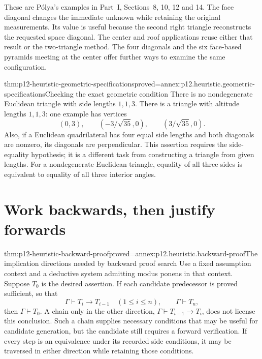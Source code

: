 These are P\'olya's examples in Part~I, Sections~8, 10, 12 and 14.
The face diagonal changes the immediate unknown while retaining the
original measurements. Its value is useful because the second
right triangle reconstructs the requested space diagonal. The center
and roof applications reuse either that result or the two-triangle
method. The four diagonals and the six face-based pyramids meeting
at the center offer further ways to examine the same configuration.

\begin{hbtheorem}{thm:p12-heuristic-geometric-specifications}{proved=annex:p12.heuristic.geometric-specifications}{Checking the exact geometric condition}
There is no nondegenerate Euclidean triangle with side lengths
\(1,1,3\). There is a triangle with altitude lengths \(1,1,3\):
one example has vertices
\[
 (0,3),\qquad(-3/\sqrt{35},0),\qquad(3/\sqrt{35},0).
\]
Also, if a Euclidean quadrilateral has four equal side lengths and
both diagonals are nonzero, its diagonals are perpendicular.
This assertion requires the side-equality hypothesis; it is a
different task from constructing a triangle from given lengths.
For a nondegenerate Euclidean triangle, equality of all three sides
is equivalent to equality of all three interior angles.
\end{hbtheorem}

\section{Work backwards, then justify forwards}

\begin{hbtheorem}{thm:p12-heuristic-backward-proof}{proved=annex:p12.heuristic.backward-proof}{The implication directions needed by backward proof search}
Use a fixed assumption context and a deductive system admitting
modus ponens in that context. Suppose \(T_0\) is the desired assertion.
If each candidate predecessor
is proved sufficient, so that
\[
 \Gamma\vdash T_i\to T_{i-1}\quad(1\le i\le n),
 \qquad\Gamma\vdash T_n,
\]
then \(\Gamma\vdash T_0\). A chain only in the other direction,
\(\Gamma\vdash T_{i-1}\to T_i\), does not license this conclusion.
Such a chain supplies necessary conditions that may be useful for
candidate generation, but the candidate still requires a forward
verification. If every step is an equivalence under its recorded
side conditions, it may be traversed in either direction while
retaining those conditions.
\end{hbtheorem}

